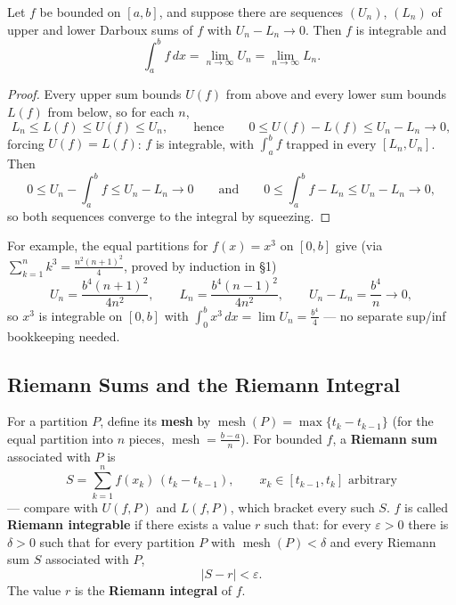 \documentclass[11pt]{report}
\begin{document}
\begin{propbox}
Let $f$ be bounded on $[a,b]$, and suppose there are sequences $(U_n)$, $(L_n)$ of upper and lower Darboux sums of $f$ with $U_n - L_n \to 0$. Then $f$ is integrable and
\[
\int_a^b f\,dx = \lim_{n\to\infty} U_n = \lim_{n\to\infty} L_n.
\]
\end{propbox}

\begin{proof}
Every upper sum bounds $U(f)$ from above and every lower sum bounds $L(f)$ from below, so for each $n$,
\[
L_n \leq L(f) \leq U(f) \leq U_n, \qquad \text{hence} \qquad 0 \leq U(f) - L(f) \leq U_n - L_n \to 0,
\]
forcing $U(f) = L(f)$: $f$ is integrable, with $\int_a^b f$ trapped in every $[L_n, U_n]$. Then
\[
0 \leq U_n - \int_a^b f \leq U_n - L_n \to 0
\qquad \text{and} \qquad
0 \leq \int_a^b f - L_n \leq U_n - L_n \to 0,
\]
so both sequences converge to the integral by squeezing.
\end{proof}

For example, the equal partitions for $f(x) = x^3$ on $[0, b]$ give (via $\sum_{k=1}^n k^3 = \tfrac{n^2(n+1)^2}{4}$, proved by induction in \S 1)
\[
U_n = \frac{b^4 (n+1)^2}{4 n^2}, \qquad L_n = \frac{b^4 (n-1)^2}{4 n^2}, \qquad U_n - L_n = \frac{b^4}{n} \to 0,
\]
so $x^3$ is integrable on $[0,b]$ with $\int_0^b x^3\,dx = \lim U_n = \tfrac{b^4}{4}$ --- no separate sup/inf bookkeeping needed.

\subsection{Riemann Sums and the Riemann Integral}

\begin{defbox}
For a partition $P$, define its \textbf{mesh} by $\operatorname{mesh}(P) = \max\{ t_k - t_{k-1} \}$ (for the equal partition into $n$ pieces, $\operatorname{mesh} = \tfrac{b-a}{n}$). For bounded $f$, a \textbf{Riemann sum} associated with $P$ is
\[
S = \sum_{k=1}^n f(x_k)\,(t_k - t_{k-1}), \qquad x_k \in [t_{k-1}, t_k] \text{ arbitrary}
\]
--- compare with $U(f,P)$ and $L(f,P)$, which bracket every such $S$. $f$ is called \textbf{Riemann integrable} if there exists a value $r$ such that: for every $\varepsilon > 0$ there is $\delta > 0$ such that for every partition $P$ with $\operatorname{mesh}(P) < \delta$ and every Riemann sum $S$ associated with $P$,
\[
|S - r| < \varepsilon.
\]
The value $r$ is the \textbf{Riemann integral} of $f$.
\end{defbox}
\end{document}

